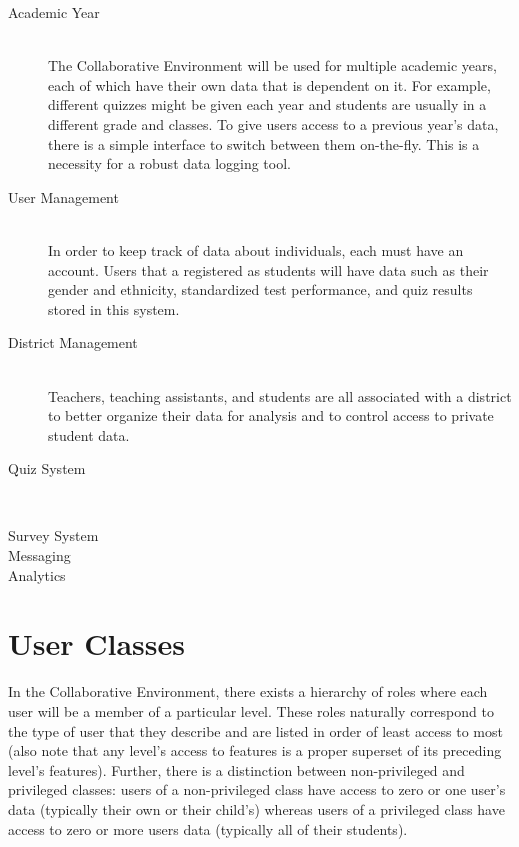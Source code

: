 \begin{description}
	\item [Academic Year] \hfill \\ The Collaborative Environment will be used for multiple academic years, each of which have their own data that is dependent on it. For example, different quizzes might be given each year and students are usually in a different grade and classes. To give users access to a previous year's data, there is a simple interface to switch between them on-the-fly. This is a necessity for a robust data logging tool.
	\item [User Management] \hfill \\ In order to keep track of data about individuals, each must have an account. Users that a registered as students will have data such as their gender and ethnicity, standardized test performance, and quiz results stored in this system.
	\item [District Management] \hfill \\ Teachers, teaching assistants, and students are all associated with a district to better organize their data for analysis and to control access to private student data.
	\item [Quiz System] \
	\item [Survey System]
	\item [Messaging]
	\item [Analytics]
\end{description}

\section{User Classes}
\label{sec:overview-user-classes}

In the Collaborative Environment, there exists a hierarchy of roles where each user will be a member of a particular level. These roles naturally correspond to the type of user that they describe and are listed in order of least access to most (also note that any level's access to features is a proper superset of its preceding level's features). Further, there is a distinction between non-privileged and privileged classes: users of a non-privileged class have access to zero or one user's data (typically their own or their child's) whereas users of a privileged class have access to zero or more users data (typically all of their students).

